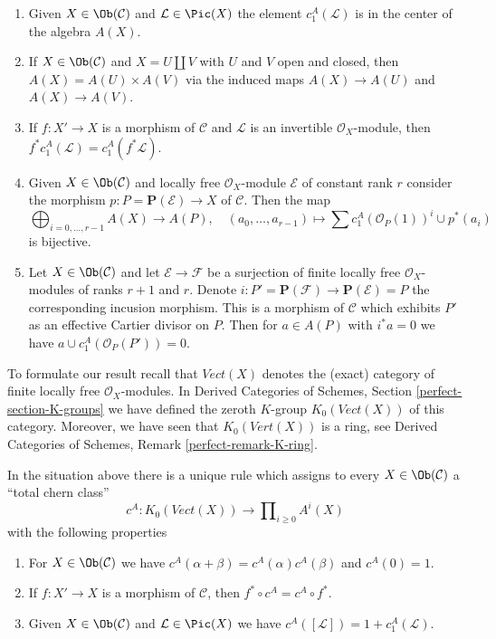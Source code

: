 \begin{enumerate}
\item Given $X \in \Ob(\mathcal{C})$ and $\mathcal{L} \in \Pic(X)$
the element $c_1^A(\mathcal{L})$ is in the center of the algebra $A(X)$.
\item If $X \in \Ob(\mathcal{C})$ and $X = U \amalg V$ with $U$ and $V$
open and closed, then $A(X) = A(U) \times A(V)$ via the induced maps
$A(X) \to A(U)$ and $A(X) \to A(V)$.
\item If $f : X' \to X$ is a morphism of $\mathcal{C}$ and $\mathcal{L}$
is an invertible $\mathcal{O}_X$-module, then $f^*c_1^A(\mathcal{L}) =
c_1^A(f^*\mathcal{L})$.
\item Given $X \in \Ob(\mathcal{C})$ and locally free $\mathcal{O}_X$-module
$\mathcal{E}$ of constant rank $r$ consider the morphism
$p : P = \mathbf{P}(\mathcal{E}) \to X$ of $\mathcal{C}$.
Then the map
$$
\bigoplus\nolimits_{i = 0, \ldots, r - 1} A(X)
\longrightarrow A(P),\quad
(a_0, \ldots, a_{r - 1}) \longmapsto
\sum c_1^A(\mathcal{O}_P(1))^i \cup p^*(a_i)
$$
is bijective.
\item Let $X \in \Ob(\mathcal{C})$ and let $\mathcal{E} \to \mathcal{F}$
be a surjection of finite locally free $\mathcal{O}_X$-modules
of ranks $r + 1$ and $r$. Denote
$i : P' = \mathbf{P}(\mathcal{F}) \to \mathbf{P}(\mathcal{E}) = P$ the
corresponding incusion morphism. This is a morphism of $\mathcal{C}$
which exhibits $P'$ as an effective Cartier divisor on $P$. Then for
$a \in A(P)$ with $i^*a = 0$ we have
$a \cup c_1^A(\mathcal{O}_P(P')) = 0$.
\end{enumerate}
To formulate our result recall that $\textit{Vect}(X)$ denotes the
(exact) category of finite locally free $\mathcal{O}_X$-modules.
In Derived Categories of Schemes, Section \ref{perfect-section-K-groups}
we have defined the zeroth $K$-group
$K_0(\textit{Vect}(X))$ of this category.
Moreover, we have seen that $K_0(\textit{Vert}(X))$ is a ring, see
Derived Categories of Schemes, Remark \ref{perfect-remark-K-ring}.

\begin{proposition}
\label{proposition-chern-class}
In the situation above there is a unique rule which assigns to
every $X \in \Ob(\mathcal{C})$ a ``total chern class''
$$
c^A : K_0(\textit{Vect}(X)) \longrightarrow  \prod\nolimits_{i \geq 0} A^i(X)
$$
with the following properties
\begin{enumerate}
\item For $X \in \Ob(\mathcal{C})$ we have
$c^A(\alpha + \beta) = c^A(\alpha) c^A(\beta)$
and $c^A(0) = 1$.
\item If $f : X' \to X$ is a morphism of $\mathcal{C}$, then
$f^* \circ c^A =  c^A \circ f^*$.
\item Given $X \in \Ob(\mathcal{C})$ and $\mathcal{L} \in \Pic(X)$
we have $c^A([\mathcal{L}]) = 1 + c_1^A(\mathcal{L})$.
\end{enumerate}
\end{proposition}

